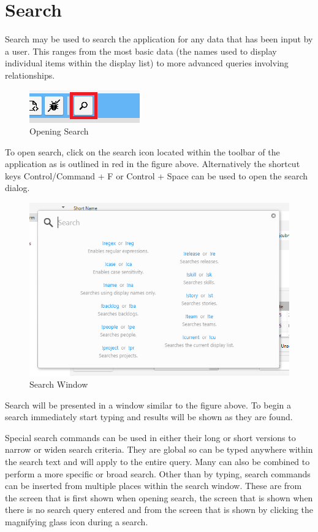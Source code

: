 \section{Search}

Search may be used to search the application for any data that has been input by a user. This ranges from the most basic data (the names used to display individual items within the display list) to more advanced queries involving relationships.

\begin{figure}[H]
\centering
\includegraphics[]{images/screenshots/search1.PNG}
\caption{Opening Search}
\label{fig:search_icon}
\end{figure}

To open search, click on the search icon located within the toolbar of the application as is outlined in red in the figure above. Alternatively the shortcut keys Control/Command + F or Control + Space can be used to open the search dialog.

\begin{figure}[H]
\centering
\includegraphics[width=\textwidth]{images/screenshots/search2.PNG}
\caption{Search Window}
\label{fig:search_window}
\end{figure}

Search will be presented in a window similar to the figure above. To begin a search immediately start typing and results will be shown as they are found.

Special search commands can be used in either their long or short versions to narrow or widen search criteria. They are global so can be typed anywhere within the search text and will apply to the entire query. Many can also be combined to perform a more specific or broad search.\newline
Other than by typing, search commands can be inserted from multiple places within the search window. These are from the screen that is first shown when opening search, the screen that is shown when there is no search query entered and from the screen that is shown by clicking the magnifying glass icon during a search. 

